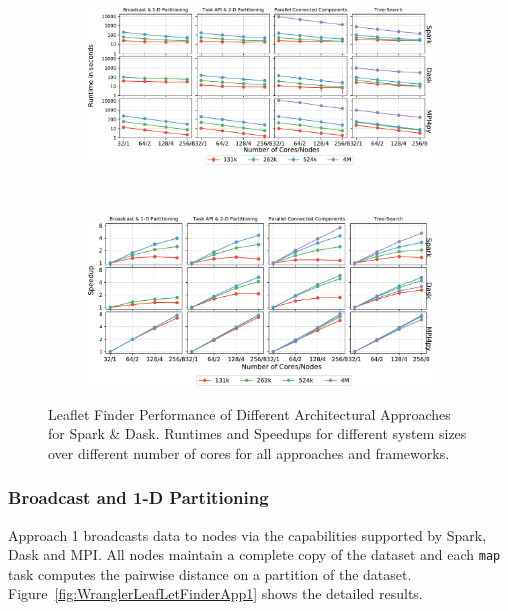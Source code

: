 \begin{figure}[t]
    \centering
    \begin{subfigure}{.85\textwidth}
        \centering
        \includegraphics[width=.95\linewidth]{figures/data_analytics_hpc/task_par/All4approachesWith4M_logscaleline.pdf}
    \end{subfigure}\\
    \begin{subfigure}{.85\textwidth}
        \centering
        \includegraphics[width=.95\linewidth]{figures/data_analytics_hpc/task_par/All4approachesWith4MSpeedup.pdf}
    \end{subfigure}
    \caption{Leaflet Finder Performance of Different Architectural Approaches
            for Spark \& Dask. Runtimes and Speedups for different system sizes
            over different number of cores for all approaches and frameworks.}
    \label{fig:All4approachesNoRp}
\end{figure}

\subsubsection*{Broadcast and 1-D Partitioning}

Approach 1 broadcasts data to nodes via the capabilities supported by Spark,
Dask and MPI. All nodes maintain a complete copy of the dataset and each
\texttt{map} task computes the pairwise distance on a partition of the dataset.
Figure~\ref{fig:WranglerLeafLetFinderApp1} shows the detailed results.

